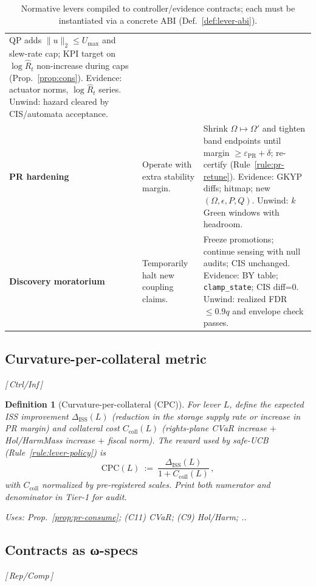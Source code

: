 \documentclass[10pt]{article}
\makeatletter
\newcommand{\uses}[1]{\par\smallskip\noindent\textit{Uses: }#1.\par\smallskip}
\newcommand{\layertag}[1]{\textsf{\footnotesize[\,#1\,]}}
\newcommand{\cutq}{q}
\newcommand{\JSGxref}[2]{%
  \@ifundefined{r@#2}{\textbf{[#1 ??]}}{#1~\ref{#2}}}
\newcommand{\secref}[1]{\JSGxref{§}{#1}}
\providecommand{\constsymPRmargin}{\varepsilon_{\mathrm{PR}}}
\newtheorem{definition}{Definition}
\makeatother
\begin{document}
\begin{table}[t]
\begin{tabularx}{\textwidth}{@{}>{\raggedright\arraybackslash}p{2.8cm} >{\raggedright\arraybackslash}p{4.6cm} >{\raggedright\arraybackslash}X@{}}
QP adds $\|u\|_2\!\le U_{\max}$ and slew-rate cap; KPI target on $\log\hat R_t$ non-increase during caps (Prop.~\ref{prop:cons}). Evidence: actuator norms, $\log\hat R_t$ series. Unwind: hazard cleared by CIS/automata acceptance. \\
\addlinespace
\textbf{PR hardening} &
Operate with extra stability margin. &
Shrink $\Omega\!\mapsto\!\Omega'$ and tighten band endpoints until margin $\ge\constsymPRmargin+\delta$; re-certify (Rule~\ref{rule:pr-retune}). Evidence: GKYP diffs; hitmap; new $(\Omega,\epsilon,P,Q)$. Unwind: $k$ Green windows with headroom. \\
\addlinespace
\textbf{Discovery moratorium} &
Temporarily halt new coupling claims. &
Freeze promotions; continue sensing with null audits; CIS unchanged. Evidence: BY table; \texttt{clamp\_state}; CIS diff=0. Unwind: realized FDR $\le0.9\cutq$ and envelope check passes. \\
\bottomrule
\end{tabularx}
\caption{Normative levers compiled to controller/evidence contracts; each must be instantiated via a concrete ABI (Def.~\ref{def:lever-abi}).}
\label{tab:normative-levers}
\end{table}

\subsection{Curvature-per-collateral metric}\label{subsec:cpc}
\emph{\layertag{Ctrl/Inf}}

\begin{definition}[Curvature-per-collateral (CPC)]\label{def:cpc}
For lever $L$, define the expected ISS improvement $\Delta_{\mathrm{ISS}}(L)$ (reduction in the storage supply rate or increase in PR margin) and collateral cost $C_{\mathrm{coll}}(L)$ (rights-plane CVaR increase $+$ Hol/HarmMass increase $+$ fiscal norm). The reward used by safe-UCB (Rule~\ref{rule:lever-policy}) is
\[
\mathrm{CPC}(L)\ :=\ \frac{\Delta_{\mathrm{ISS}}(L)}{1 + C_{\mathrm{coll}}(L)}\,,
\]
with $C_{\mathrm{coll}}$ normalized by pre-registered scales. Print both numerator and denominator in Tier-1 for audit.
\uses{Prop.~\ref{prop:pr-consume}; (C11) CVaR; (C9) Hol/Harm; \secref{subsec:levers}.}
\end{definition}

\subsection{Contracts as ω-specs}\label{subsec:gov-omega}
\emph{\layertag{Rep/Comp}}
\end{document}
